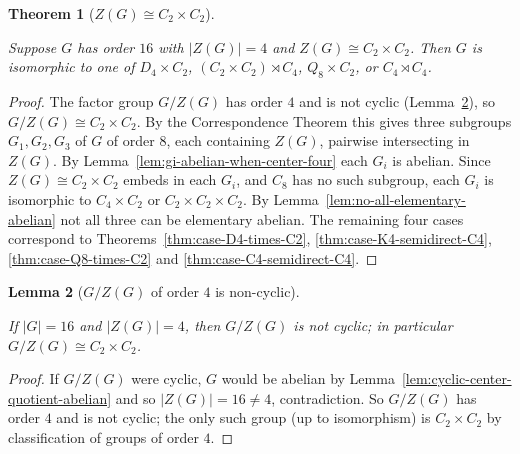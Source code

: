 \documentclass{article}
\newtheorem{theorem}{Theorem}[section]
\newtheorem{lemma}[theorem]{Lemma}
\theoremstyle{definition}
\newcommand{\lean}[1]{}
\newcommand{\leanok}{}
\newcommand{\leanfile}[1]{}
\newcommand{\uses}[1]{}
\begin{document}
\begin{theorem}[$Z(G) \cong C_2 \times C_2$]
    \label{thm:center-four-klein}
    \uses{lem:order-four-quotient-not-cyclic,thm:case-D4-times-C2,
          thm:case-K4-semidirect-C4,thm:case-Q8-times-C2,
          thm:case-C4-semidirect-C4}
    Suppose $G$ has order $16$ with $|Z(G)| = 4$ and $Z(G) \cong
    C_2 \times C_2$. Then $G$ is isomorphic to one of
    $D_4 \times C_2$, $(C_2 \times C_2) \rtimes C_4$, $Q_8 \times C_2$, or
    $C_4 \rtimes C_4$.
\end{theorem}
\begin{proof}
    \uses{lem:order-four-quotient-not-cyclic,thm:case-D4-times-C2,
          thm:case-K4-semidirect-C4,thm:case-Q8-times-C2,
          thm:case-C4-semidirect-C4,lem:gi-abelian-when-center-four,
          lem:no-all-elementary-abelian}
    The factor group $G/Z(G)$ has order $4$ and is not cyclic
    (Lemma~\ref{lem:order-four-quotient-not-cyclic}), so
    $G/Z(G) \cong C_2 \times C_2$. By the Correspondence Theorem this gives
    three subgroups $G_1, G_2, G_3$ of $G$ of order $8$, each containing
    $Z(G)$, pairwise intersecting in $Z(G)$. By
    Lemma~\ref{lem:gi-abelian-when-center-four} each $G_i$ is abelian. Since
    $Z(G) \cong C_2 \times C_2$ embeds in each $G_i$, and $C_8$ has no such
    subgroup, each $G_i$ is isomorphic to $C_4 \times C_2$ or
    $C_2 \times C_2 \times C_2$. By
    Lemma~\ref{lem:no-all-elementary-abelian} not all three can be
    elementary abelian. The remaining four cases correspond to
    Theorems~\ref{thm:case-D4-times-C2}, \ref{thm:case-K4-semidirect-C4},
    \ref{thm:case-Q8-times-C2} and \ref{thm:case-C4-semidirect-C4}.
\end{proof}

\begin{lemma}[$G/Z(G)$ of order $4$ is non-cyclic]
    \label{lem:order-four-quotient-not-cyclic}
    \lean{OrderSixteen.Prelim.order_four_quotient_not_cyclic}
    \leanfile{M2rGroup7/SixteenCase.lean}
    \uses{lem:cyclic-center-quotient-abelian, lem:abelian-iff-center-top}
    \leanok
    If $|G| = 16$ and $|Z(G)| = 4$, then $G/Z(G)$ is not cyclic; in particular
    $G/Z(G) \cong C_2 \times C_2$.
\end{lemma}
\begin{proof}
    \uses{lem:cyclic-center-quotient-abelian,lem:abelian-iff-center-top}
    If $G/Z(G)$ were cyclic, $G$ would be abelian by
    Lemma~\ref{lem:cyclic-center-quotient-abelian} and so
    $|Z(G)| = 16 \ne 4$, contradiction. So $G/Z(G)$ has order $4$ and is not
    cyclic; the only such group (up to isomorphism) is $C_2 \times C_2$ by
    classification of groups of order $4$.
\end{proof}
\end{document}
